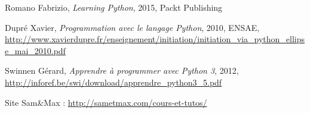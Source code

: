 \documentclass[12pt, a4paper]{article}
\begin{document}
Romano Fabrizio, \textit{Learning Python}, 2015, Packt Publishing

Dupré Xavier, \textit{Programmation avec le langage Python}, 2010, ENSAE, \url{http://www.xavierdupre.fr/enseignement/initiation/initiation_via_python_ellipse_mai_2010.pdf}

Swinnen Gérard, \textit{Apprendre à programmer avec Python 3}, 2012, \url{http://inforef.be/swi/download/apprendre_python3_5.pdf}

Site Sam\&Max : \url{http://sametmax.com/cours-et-tutos/}


\end{document}
